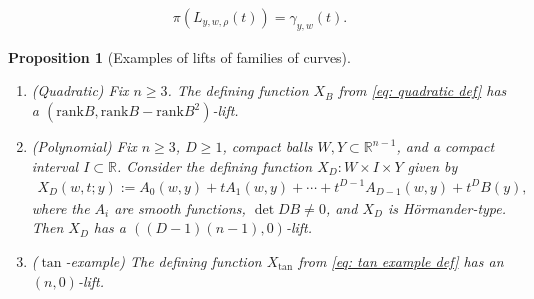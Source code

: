 \documentclass[10pt,a4paper]{amsart}
\newtheorem{proposition}{Proposition}
\def\R{\mathbb{R}}
\renewcommand\geq{\geqslant}
\newcommand{\rank}{\mathrm{rank}}
\begin{document}
            \begin{align}\label{eq: projection property}
                \pi(L_{y,w,\rho}(t)) = \gamma_{y,w}(t).
            \end{align}

    \begin{proposition}[Examples of lifts of families of curves] \label{prop: lifting examples}\hspace{0pt} 
        \begin{enumerate}[label=(\roman*)]
            \item (Quadratic) Fix $n \geq 3$. The defining function $X_B$ from \eqref{eq: quadratic def} has a $(\rank B, \rank B - \rank B^2)$-lift.
            \item (Polynomial) Fix $n\geq 3$, $D \geq 1$, compact balls $W,Y \subset \R^{n-1}$, and a compact interval $I \subset \R$. Consider the defining function $X_D : W \times I \times Y$ given by 
            \begin{align}
                X_D(w,t;y) := A_0(w,y) + tA_1(w,y) + \cdots + t^{D-1} A_{D-1}(w,y) + t^D B(y),
            \end{align}
            where the $A_i$ are smooth functions, $\det DB \neq 0$, and $X_D$ is H\"ormander-type. Then $X_D$ has a $((D-1)(n-1), 0)$-lift.
            \item ($\tan$-example) The defining function $X_{\tan}$ from \eqref{eq: tan example def} has an $(n,0)$-lift. 
        \end{enumerate}
    \end{proposition}
\end{document}
